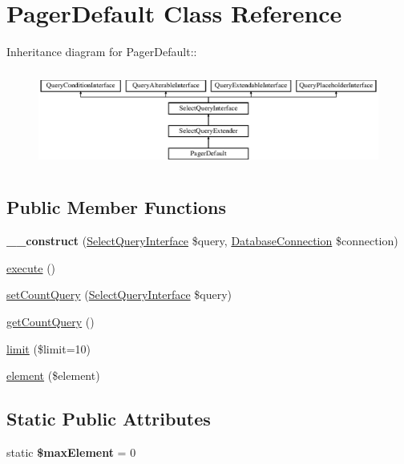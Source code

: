 \hypertarget{classPagerDefault}{
\section{PagerDefault Class Reference}
\label{classPagerDefault}
}
Inheritance diagram for PagerDefault::\begin{figure}[H]
\begin{center}
\leavevmode
\includegraphics[height=3.21839cm]{classPagerDefault}
\end{center}
\end{figure}
\subsection*{Public Member Functions}
\begin{DoxyCompactItemize}
\item 
\hypertarget{classPagerDefault_a23e41437cab504907b91ea9a42a1a20d}{
{\bfseries \_\-\_\-construct} (\hyperlink{interfaceSelectQueryInterface}{SelectQueryInterface} \$query, \hyperlink{classDatabaseConnection}{DatabaseConnection} \$connection)}
\label{classPagerDefault_a23e41437cab504907b91ea9a42a1a20d}

\item 
\hyperlink{classPagerDefault_ae92935d692c4a7867132235818c3fe1a}{execute} ()
\item 
\hyperlink{classPagerDefault_abf3bd3639cde71ae6e85c74b9fbfd42c}{setCountQuery} (\hyperlink{interfaceSelectQueryInterface}{SelectQueryInterface} \$query)
\item 
\hyperlink{classPagerDefault_ab1fe3f648bad90c0bb9c1760fee20fed}{getCountQuery} ()
\item 
\hyperlink{classPagerDefault_a3765bcd78bdef3da178ee071113ec28d}{limit} (\$limit=10)
\item 
\hyperlink{classPagerDefault_a950e555daf95d3af4aeaf23209a183d0}{element} (\$element)
\end{DoxyCompactItemize}
\subsection*{Static Public Attributes}
\begin{DoxyCompactItemize}
\item 
\hypertarget{classPagerDefault_a98773ffb92c70067ba49df6fdca0eb21}{
static {\bfseries \$maxElement} = 0}
\label{classPagerDefault_a98773ffb92c70067ba49df6fdca0eb21}

\end{DoxyCompactItemize}
